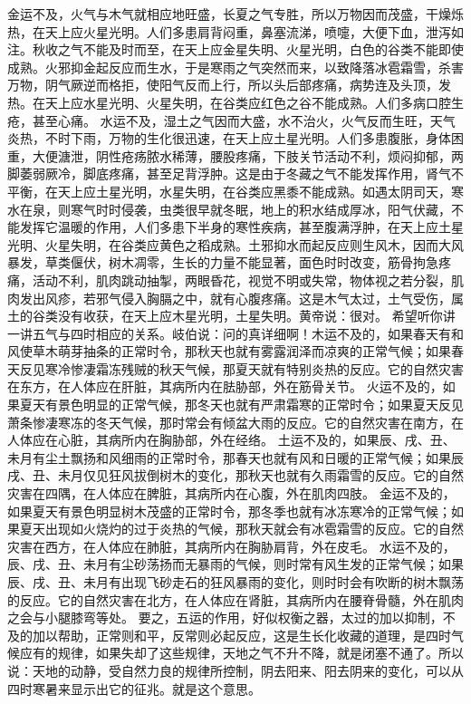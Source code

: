 \documentclass[a4paper,12pt,UTF8,twoside]{ctexbook}
\begin{document}
金运不及，火气与木气就相应地旺盛，长夏之气专胜，所以万物因而茂盛，干燥烁热，在天上应火星光明。人们多患肩背闷重，鼻塞流涕，喷嚏，大便下血，泄泻如注。秋收之气不能及时而至，在天上应金星失明、火星光明，白色的谷类不能即使成熟。火邪抑金起反应而生水，于是寒雨之气突然而来，以致降落冰雹霜雪，杀害万物，阴气厥逆而格拒，使阳气反而上行，所以头后部疼痛，病势连及头顶，发热。在天上应水星光明、火星失明，在谷类应红色之谷不能成熟。人们多病口腔生疮，甚至心痛。
水运不及，湿土之气因而大盛，水不治火，火气反而生旺，天气炎热，不时下雨，万物的生化很迅速，在天上应土星光明。人们多患腹胀，身体困重，大便溏泄，阴性疮疡脓水稀薄，腰股疼痛，下肢关节活动不利，烦闷抑郁，两脚萎弱厥冷，脚底疼痛，甚至足背浮肿。这是由于冬藏之气不能发挥作用，肾气不平衡，在天上应土星光明，水星失明，在谷类应黑黍不能成熟。如遇太阴司天，寒水在泉，则寒气时时侵袭，虫类很早就冬眠，地上的积水结成厚冰，阳气伏藏，不能发挥它温暖的作用，人们多患下半身的寒性疾病，甚至腹满浮肿，在天上应土星光明、火星失明，在谷类应黄色之稻成熟。土邪抑水而起反应则生风木，因而大风暴发，草类偃伏，树木凋零，生长的力量不能显著，面色时时改变，筋骨拘急疼痛，活动不利，肌肉跳动抽掣，两眼昏花，视觉不明或失常，物体视之若分裂，肌肉发出风疹，若邪气侵入胸膈之中，就有心腹疼痛。这是木气太过，土气受伤，属土的谷类没有收获，在天上应木星光明，土星失明。黄帝说：很对。
希望听你讲一讲五气与四时相应的关系。岐伯说：问的真详细啊！木运不及的，如果春天有和风使草木萌芽抽条的正常时令，那秋天也就有雾露润泽而凉爽的正常气候；如果春天反见寒冷惨凄霜冻残贼的秋天气候，那夏天就有特别炎热的反应。它的自然灾害在东方，在人体应在肝脏，其病所内在胠胁部，外在筋骨关节。
火运不及的，如果夏天有景色明显的正常气候，那冬天也就有严肃霜寒的正常时令；如果夏天反见萧条惨凄寒冻的冬天气候，那时常会有倾盆大雨的反应。它的自然灾害在南方，在人体应在心脏，其病所内在胸胁部，外在经络。
土运不及的，如果辰、戌、丑、未月有尘土飘扬和风细雨的正常时令，那春天也就有风和日暖的正常气候；如果辰戌、丑、未月仅见狂风拔倒树木的变化，那秋天也就有久雨霜雪的反应。它的自然灾害在四隅，在人体应在脾脏，其病所内在心腹，外在肌肉四肢。
金运不及的，如果夏天有景色明显树木茂盛的正常时令，那冬季也就有冰冻寒冷的正常气候；如果夏天出现如火烧灼的过于炎热的气候，那秋天就会有冰雹霜雪的反应。它的自然灾害在西方，在人体应在肺脏，其病所内在胸胁肩背，外在皮毛。
水运不及的，辰、戌、丑、未月有尘砂荡扬而无暴雨的气候，则时常有风生发的正常气候；如果辰、戌、丑、未月有出现飞砂走石的狂风暴雨的变化，则时时会有吹断的树木飘荡的反应。它的自然灾害在北方，在人体应在肾脏，其病所内在腰脊骨髓，外在肌肉之会与小腿膝弯等处。
要之，五运的作用，好似权衡之器，太过的加以抑制，不及的加以帮助，正常则和平，反常则必起反应，这是生长化收藏的道理，是四时气候应有的规律，如果失却了这些规律，天地之气不升不降，就是闭塞不通了。所以说：天地的动静，受自然力良的规律所控制，阴去阳来、阳去阴来的变化，可以从四时寒暑来显示出它的征兆。就是这个意思。
\end{document}
